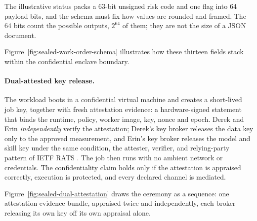 \documentclass[11pt,a4paper]{article}
\theoremstyle{definition}
\begin{document}
The illustrative status packs a 63-bit unsigned risk code and one flag into
64 payload bits, and the schema must fix how values are rounded and framed.
The 64 bits count the possible outputs, $2^{64}$ of them; they are not the
size of a JSON document.

Figure~\ref{fig:sealed-work-order-schema} illustrates how these thirteen
fields stack within the confidential enclave boundary.



\paragraph{Dual-attested key release.}
The workload boots in a confidential virtual machine and creates a
short-lived job key, together with fresh attestation evidence: a
hardware-signed statement that binds the runtime, policy, worker image, key,
nonce and epoch. Derek and Erin \emph{independently} verify the
attestation; Derek's key broker releases the data key only to the approved
measurement, and Erin's key broker releases the model and skill key under the
same condition, the attester, verifier, and relying-party pattern of IETF RATS
. The job then runs with no ambient network or credentials.
The confidentiality claim holds only if the attestation is appraised
correctly, execution is protected, and every declared channel is mediated.

Figure~\ref{fig:sealed-dual-attestation} draws the ceremony as a sequence:
one attestation evidence bundle, appraised twice and independently, each
broker releasing its own key off its own appraisal alone.


\end{document}
